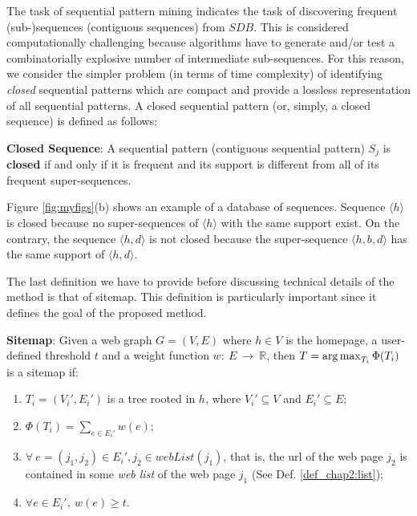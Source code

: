 The task of sequential pattern mining indicates the task of discovering frequent (sub-)sequences (contiguous sequences) from $SDB$. This is considered computationally challenging because  algorithms have to generate and/or test a combinatorially explosive number of intermediate sub-sequences. For this reason, we consider the simpler problem (in terms of time complexity) of identifying \textit{closed} sequential patterns which are compact and provide a lossless representation of all sequential patterns. A closed sequential pattern (or, simply, a closed sequence) is defined as follows:

\begin{definition}\label{def:closedSeq}\textbf{Closed Sequence}: %
A sequential pattern (contiguous sequential pattern) $S_j$ is \textbf{closed} if and only if it is frequent and its support is different from all of its frequent super-sequences.
\end{definition}
\begin{example}
Figure \ref{fig:myfigs}(b) shows an example of a database of sequences. Sequence $\langle h \rangle$ is closed because no super-sequences of $\langle h \rangle$  with the same support exist. 
On the contrary, the sequence $\langle h, d \rangle$ is not closed because the super-sequence $\langle h, b, d \rangle$ has the same support of $\langle h, d \rangle$.
\end{example}
\noindent



The last definition we have to provide before discussing technical details of the method is that of sitemap. This definition is particularly important since it defines the goal of the proposed method.



\begin{definition}\label{def:sitemap}\textbf{Sitemap}:
Given a web graph $G = (V,E)$ where $h\in V$ is the homepage, a user-defined threshold $t$ and a weight function $w:~E~\rightarrow~\mathbb{R} $, then $T = \operatorname*{arg\,max}_{{T_i}}{\Phi(T_i)}$ is a sitemap if:
\begin{enumerate}
\item $T_i= (V_i',E_i')$ is a tree rooted in $h$, where $V_i' \subseteq V$ and $E_i' \subseteq E$;
\item $ \Phi(T_i) = \sum_{e \in E_i'} w(e)$;
\item  $\forall~e = (j_1,j_2) \in E_i', j_2 \in webList(j_1)$, that is, the url of the web page $j_2$ is contained in some \textit{web list} of the web page $j_1$ (See Def. \ref{def_chap2:list}); 
\item $\forall e \in E_i',~w(e) \geq t$. 
\end{enumerate} 
\end{definition}


